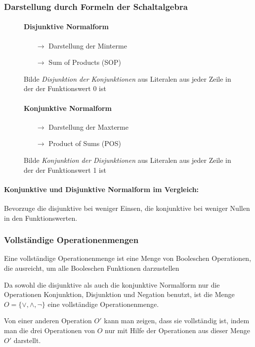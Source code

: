 \documentclass[12pt]{report}
\begin{document}
\subsubsection{Darstellung durch Formeln der Schaltalgebra}
\begin{figure}[H]
  \begin{minipage}{0.46\textwidth}
    \paragraph{Disjunktive Normalform}
    \begin{itemize}
      \item[$\rightarrow$] Darstellung der Minterme
      \item[$\rightarrow$] Sum of Products (SOP)
    \end{itemize}
    Bilde \textit{Disjunktion der Konjunktionen} aus Literalen aus jeder Zeile in der der Funktionswert 0 ist
  \end{minipage}
  \hfill
  \begin{minipage}{0.46\textwidth}
    \paragraph{Konjunktive Normalform}
    \begin{itemize}
      \item[$\rightarrow$] Darstellung der Maxterme
      \item[$\rightarrow$] Product of Sums (POS)
    \end{itemize}
    Bilde \textit{Konjunktion der Disjunktionen} aus Literalen aus jeder Zeile in der der Funktionswert 1 ist
  \end{minipage}
\end{figure}

\paragraph{Konjunktive und Disjunktive Normalform im Vergleich:}
Bevorzuge die disjunktive bei weniger Einsen, die konjunktive
bei weniger Nullen in den Funktionswerten.

\subsubsection{Vollständige Operationenmengen}
\begin{defbox}
  Eine vollständige Operationenmenge ist eine Menge von Booleschen Operationen, die ausreicht, um alle Booleschen Funktionen darzustellen
\end{defbox}
Da sowohl die disjunktive als auch die konjunktive Normalform nur die Operationen Konjunktion, Disjunktion und Negation benutzt, ist die Menge $O=\{ \vee, \wedge, \neg\}$ eine vollständige Operationenmenge.
\par Von einer anderen Operation $O'$ kann man zeigen, dass sie vollständig ist, indem man die drei Operationen von $O$ nur mit Hilfe der Operationen aus dieser Menge $O'$ darstellt.
\end{document}
